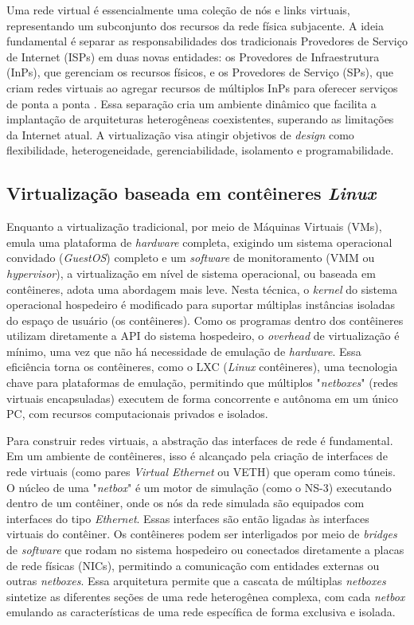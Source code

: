 Uma rede virtual é essencialmente uma coleção de nós e links virtuais, representando um subconjunto dos recursos da rede física subjacente. A ideia fundamental é separar as responsabilidades dos tradicionais Provedores de Serviço de Internet (ISPs) em duas novas entidades: os Provedores de Infraestrutura (InPs), que gerenciam os recursos físicos, e os Provedores de Serviço (SPs), que criam redes virtuais ao agregar recursos de múltiplos InPs para oferecer serviços de ponta a ponta \cite{aSurveyOfNetworkVirtualization2010}. Essa separação cria um ambiente dinâmico que facilita a implantação de arquiteturas heterogêneas coexistentes, superando as limitações da Internet atual. A virtualização visa atingir objetivos de \textit{design} como flexibilidade, heterogeneidade, gerenciabilidade, isolamento e programabilidade.

\subsection{Virtualização baseada em contêineres \textit{Linux}}

Enquanto a virtualização tradicional, por meio de Máquinas Virtuais (VMs), emula uma plataforma de \textit{hardware} completa, exigindo um sistema operacional convidado (\textit{GuestOS}) completo e um \textit{software} de monitoramento (VMM ou \textit{hypervisor}), a virtualização em nível de sistema operacional, ou baseada em contêineres, adota uma abordagem mais leve. Nesta técnica, o \textit{kernel} do sistema operacional hospedeiro é modificado para suportar múltiplas instâncias isoladas do espaço de usuário (os contêineres). Como os programas dentro dos contêineres utilizam diretamente a API do sistema hospedeiro, o \textit{overhead} de virtualização é mínimo, uma vez que não há necessidade de emulação de \textit{hardware}. Essa eficiência torna os contêineres, como o LXC (\textit{Linux} contêineres), uma tecnologia chave para plataformas de emulação, permitindo que múltiplos "\textit{netboxes}" (redes virtuais encapsuladas) executem de forma concorrente e autônoma em um único PC, com recursos computacionais privados e isolados.

Para construir redes virtuais, a abstração das interfaces de rede é fundamental. Em um ambiente de contêineres, isso é alcançado pela criação de interfaces de rede virtuais (como pares \textit{Virtual Ethernet} ou VETH) que operam como túneis. O núcleo de uma "\textit{netbox}" é um motor de simulação (como o NS-3) executando dentro de um contêiner, onde os nós da rede simulada são equipados com interfaces do tipo \textit{Ethernet}. Essas interfaces são então ligadas às interfaces virtuais do contêiner. Os contêineres podem ser interligados por meio de \textit{bridges} de \textit{software} que rodam no sistema hospedeiro ou conectados diretamente a placas de rede físicas (NICs), permitindo a comunicação com entidades externas ou outras \textit{netboxes}. Essa arquitetura permite que a cascata de múltiplas \textit{netboxes} sintetize as diferentes seções de uma rede heterogênea complexa, com cada \textit{netbox} emulando as características de uma rede específica de forma exclusiva e isolada.

